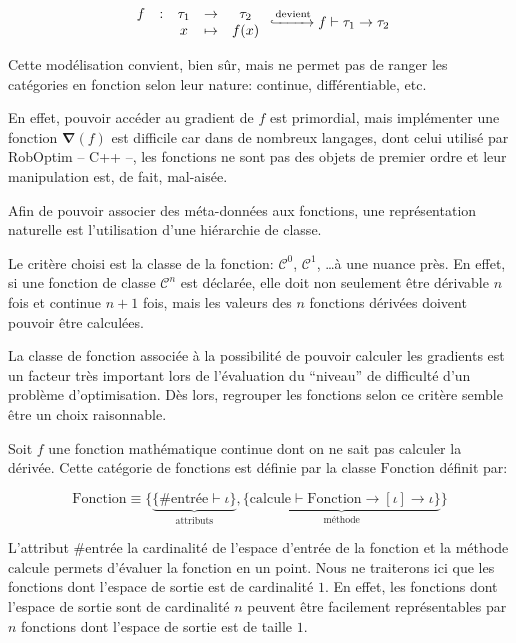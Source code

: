\begin{equation}
  \begin{array}{ccccc}
    f & : & \tau_1 & \rightarrow & \tau_2\\
    ~ & ~ & x      & \mapsto     & f(x)
  \end{array}
  \xhookrightarrow{\text{devient}}
  f \vdash \tau_1 \rightarrow \tau_2
\end{equation}

Cette modélisation convient, bien sûr, mais ne permet pas de ranger
les catégories en fonction selon leur nature: continue,
différentiable, etc.

En effet, pouvoir accéder au gradient de $f$ est primordial, mais
implémenter une fonction $\mathbf{\nabla}(f)$ est difficile car dans
de nombreux langages, dont celui utilisé par RobOptim -- C++ --, les
fonctions ne sont pas des objets de premier ordre et leur manipulation
est, de fait, mal-aisée.

Afin de pouvoir associer des méta-données aux fonctions, une
représentation naturelle est l'utilisation d'une hiérarchie de classe.

Le critère choisi est la classe de la fonction: $\mathcal{C}^0$,
$\mathcal{C}^1$, \ldots à une nuance près. En effet, si une fonction
de classe $\mathcal{C}^n$ est déclarée, elle doit non seulement être
dérivable $n$ fois et continue $n+1$ fois, mais les valeurs des $n$
fonctions dérivées doivent pouvoir être calculées.

La classe de fonction associée à la possibilité de pouvoir calculer
les gradients est un facteur très important lors de l'évaluation du
``niveau'' de difficulté d'un problème d'optimisation. Dès lors,
regrouper les fonctions selon ce critère semble être un choix
raisonnable.

\begin{mydef}\label{def:chap1_fcn}
  Soit $f$ une fonction mathématique continue dont on ne sait pas
  calculer la dérivée. Cette catégorie de fonctions est définie par la
  classe $\text{Fonction}$ définit par:

  \begin{equation}
    \text{Fonction} \equiv \{ \underbrace{\{ \#\text{entrée} \vdash
      \iota \}}_{\text{attributs}}, \underbrace{\{ \text{calcule}
      \vdash \text{Fonction} \rightarrow[\iota] \rightarrow \iota \}}_{\text{méthode}} \}
  \end{equation}

  L'attribut $\#\text{entrée}$ la cardinalité de l'espace d'entrée de
  la fonction et la méthode $\text{calcule}$ permets d'évaluer la
  fonction en un point. Nous ne traiterons ici que les fonctions dont
  l'espace de sortie est de cardinalité $1$. En effet, les fonctions
  dont l'espace de sortie sont de cardinalité $n$ peuvent être
  facilement représentables par $n$ fonctions dont l'espace de sortie
  est de taille $1$.
\end{mydef}

